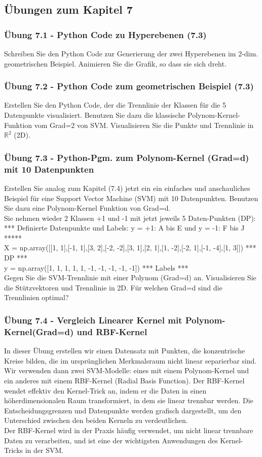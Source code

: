 \documentclass[12pt]{article}
\begin{document}
\subsection{Übungen zum Kapitel 7}

\subsubsection{Übung 7.1 - Python Code zu Hyperebenen (7.3)}
%
Schreiben Sie den Python Code zur Generierung der zwei Hyperebenen im 2-dim. geometrischen Beispiel. Animieren Sie die Grafik, so dass sie sich dreht. 
%
\subsubsection{Übung 7.2 - Python Code zum geometrischen Beispiel (7.3)}
%
Erstellen Sie den Python Code, der die Trennlinie der Klassen für die 5 Datenpunkte visualisiert. Benutzen Sie dazu die klassische Polynom-Kernel-Funktion vom Grad=2 von SVM. Visualisieren Sie die Punkte und Trennlinie in $\mathbb{R}^2$ (2D). 
%
\subsubsection{Übung 7.3 - Python-Pgm. zum Polynom-Kernel (Grad=d) mit 10 Datenpunkten}
%
Erstellen Sie analog zum Kapitel (7.4) jetzt ein ein einfaches und anschauliches Beispiel für eine Support Vector Machine (SVM) mit 10 Datenpunkten. Benutzen Sie dazu eine Polynom-Kernel Funktion von Grad=d. \\
Sie nehmen wieder 2 Klassen +1 und -1 mit jetzt jeweils 5 Daten-Punkten (DP):\\
*** Definierte Datenpunkte und Labels: y = +1: A bis E und y = -1: F bis J *****\\
X = np.array([[1, 1],[-1, 1],[3, 2],[-2, -2],[3, 1],[2, 1],[1, -2],[-2, 1],[-1, -4],[1, 3]])  *** DP ***\\ 
y = np.array([1, 1, 1, 1, 1, -1, -1, -1, -1, -1]) *** Labels *** \\
Gegen Sie die SVM-Trennlinie mit einer Polynom (Grad=d) an. Visualisieren Sie die Stützvektoren und Trennlinie in 2D. Für welchen Grad=d sind die Trennlinien optimal?
%
\subsubsection{Übung 7.4 - Vergleich Linearer Kernel mit Polynom-Kernel(Grad=d) und RBF-Kernel}
%
In dieser Übung erstellen wir einen Datensatz mit Punkten, die konzentrische Kreise bilden, die im ursprünglichen Merkmalsraum nicht linear separierbar sind. Wir verwenden dann zwei SVM-Modelle: eines mit einem Polynom-Kernel und ein anderes mit einem RBF-Kernel (Radial Basis Function). Der RBF-Kernel wendet effektiv den Kernel-Trick an, indem er die Daten in einen höherdimensionalen Raum transformiert, in dem sie linear trennbar werden. Die Entscheidungsgrenzen und Datenpunkte werden grafisch dargestellt, um den Unterschied zwischen den beiden Kerneln zu verdeutlichen.\\
Der RBF-Kernel wird in der Praxis häufig verwendet, um nicht linear trennbare Daten zu verarbeiten, und ist eine der wichtigsten Anwendungen des Kernel-Tricks in der SVM.
\end{document}
